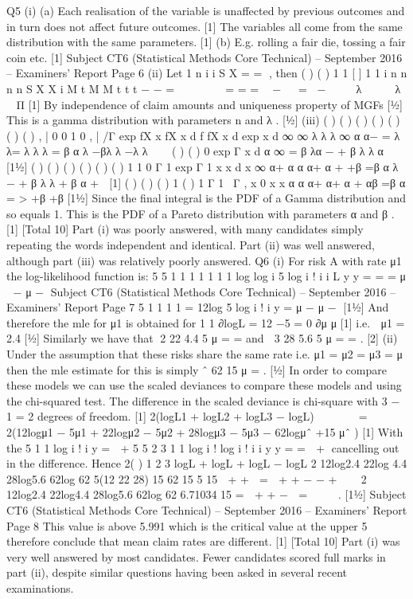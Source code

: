 \documentclass[a4paper,12pt]{article}
\begin{document}
\newpage
  Q5 (i) (a) Each realisation of the variable is unaffected by previous outcomes and
in turn does not affect future outcomes. [1]
The variables all come from the same distribution with the same
parameters. [1]
(b) E.g. rolling a fair die, tossing a fair coin etc. [1]
Subject CT6 (Statistical Methods Core Technical) – September 2016 – Examiners’ Report
Page 6
(ii) Let
1
n
i
i
S X
=
  = , then
( ) ( )
1
1
[ ] 1 1 i
n n n
n
S X X
i
M t M M t t t
− −
=
        = = =  −   = −    λ    λ  
Π [1]
By independence of claim amounts and uniqueness property of MGFs [½]
This is a gamma distribution with parameters n and λ . [½]
(iii) ( ) ( ) ( ) ( )
( ) ( ) ( )
, |
  0 0
1
0
, |
  /Γ exp
fX x fX x d f fX x d
exp x d
∞ ∞
λ λ λ
∞
α α−
= λ λ= λ λ λ
= β α λ −βλ λ −λ λ
 

( ) { ( ) }
0
exp
Γ
x d
α ∞
= β λα − + β λ λ
α  [1½]
( ) ( )
( )
( )
( ) { ( ) }
1
1
0
Γ 1
\Γ exp
Γ 1
x
x d
x
∞ α+
  α α
α+
  α + +β
=β α λ − + β λ λ
+ β α +  [1]
( ) ( )
( ) 1 ( ) 1
Γ 1
\ Γ , x 0
x x
α
α
α+ α+
  α + αβ =β α = >
  +β +β
[1½]
Since the final integral is the PDF of a Gamma distribution and so equals 1.
This is the PDF of a Pareto distribution with parameters α and β . [1]
[Total 10]
Part (i) was poorly answered, with many candidates simply repeating the
words independent and identical. Part (ii) was well answered, although part
(iii) was relatively poorly answered.
Q6 (i) For risk A with rate μ1 the log-likelihood function is:
  5 5
1 1 1 1 1
1 1
log log i 5 log i !
  i i
L y y
= =
  = μ  − μ −
Subject CT6 (Statistical Methods Core Technical) – September 2016 – Examiners’ Report
Page 7
5
1 1 1
1
= 12log 5 log i !
  i
y
=
  μ − μ − [1½]
And therefore the mle for μ1 is obtained for
1 1
∂logL = 12 −5 = 0
∂μ μ
[1]
i.e. 
μ1 = 2.4 [½]
Similarly we have that 2
22 4.4
5
μ = = and 
3
28 5.6
5
μ = = . [2]
(ii) Under the assumption that these risks share the same rate i.e. μ1 = μ2 = μ3 = μ
then the mle estimate for this is simply ˆ 62
15
μ = . [½]
In order to compare these models we can use the scaled deviances to compare
these models and using the chi-squared test.
The difference in the scaled deviance is chi-square with 3 − 1 = 2 degrees of
freedom. [1]
2(logL1 + logL2 + logL3 − logL)
     
= 2(12logμ1 − 5μ1 + 22logμ2 − 5μ2 + 28logμ3 − 5μ3 − 62logμˆ +15 μˆ ) [1]
With the
5
1
1
log i !
  i
y
= 
+
  5 5
2 3
1 1
log i ! log i !
  i i
y y
= =
   + cancelling out in the difference.
Hence
2( ) 1 2 3 logL + logL + logL − logL
2 12log2.4 22log 4.4 28log5.6 62log 62 5(12 22 28) 15 62
15 5 15
 + + 
=  + + − − + 
 
2 12log2.4 22log4.4 28log5.6 62log 62 6.71034
15
=  + + −  =  
 
. [1½]
Subject CT6 (Statistical Methods Core Technical) – September 2016 – Examiners’ Report
Page 8
This value is above 5.991 which is the critical value at the upper 5%
therefore conclude that mean claim rates are different. [1]
[Total 10]
Part (i) was very well answered by most candidates. Fewer candidates
scored full marks in part (ii), despite similar questions having been asked in
several recent examinations.
\end{document}
